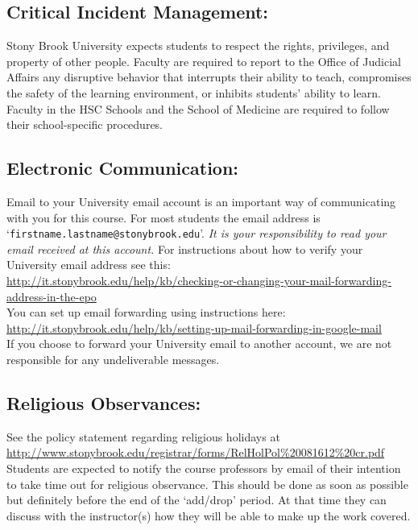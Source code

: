 \documentclass[11pt]{article}
\begin{document}
\subsection*{Critical Incident Management: }

\noindent Stony Brook University expects students to respect the
rights, privileges, and property of other people. Faculty are required
to report to the Office of Judicial Affairs any disruptive behavior
that interrupts their ability to teach, compromises the safety of the
learning environment, or inhibits students' ability to learn.  Faculty
in the HSC Schools and the School of Medicine are required to follow
their school-specific procedures.



\subsection*{Electronic Communication: }

\noindent Email to your University email account is an important way
of communicating with you for this course.  For most students the
email address is `{\tt firstname.lastname@stonybrook.edu}'.
{\em It is your responsibility to read your email received at this
  account.}  For instructions about how to verify your University
email address see this: \\[0.25em]
\url{http://it.stonybrook.edu/help/kb/checking-or-changing-your-mail-forwarding-address-in-the-epo}
\\[0.25em]
%
You can set up email forwarding using instructions here: \\[0.25em]
\url{http://it.stonybrook.edu/help/kb/setting-up-mail-forwarding-in-google-mail}
\\[0.25em]
%
If you choose to forward your University email to another account, we
are not responsible for any undeliverable messages.

\subsection*{Religious Observances: }

\noindent See the policy statement regarding religious holidays at
\\[0.25em] {
  \url{http://www.stonybrook.edu/registrar/forms/RelHolPol\%20081612\%20cr.pdf}}
\\[0.25em]
%
Students are expected to notify the course professors by email of
their intention to take time out for religious observance.  This
should be done as soon as possible but definitely before the end of
the `add/drop' period.  At that time they can discuss with the
instructor(s) how they will be able to make up the work covered.
\end{document}
